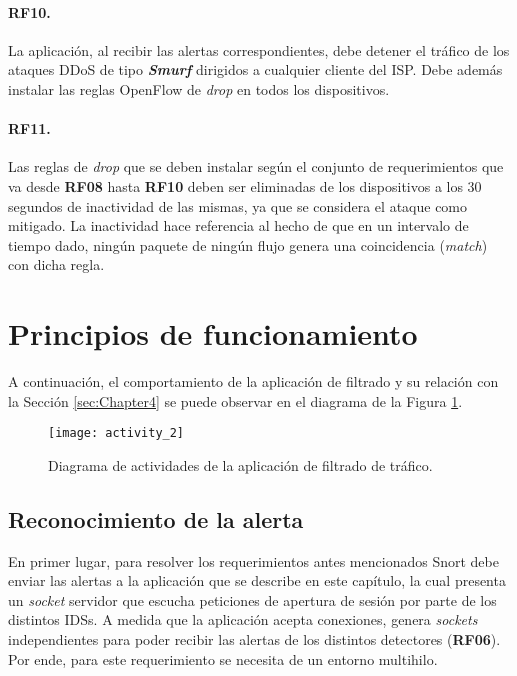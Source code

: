 \paragraph{RF10.} La aplicación, al recibir las alertas correspondientes, debe
detener el tráfico de los ataques DDoS de tipo \textbf{\textit{Smurf}} dirigidos
a cualquier cliente del ISP. Debe además instalar las reglas OpenFlow de
\textit{drop} en todos los dispositivos.

\paragraph{RF11.} Las reglas de \textit{drop} que se deben instalar según el
conjunto de requerimientos que va desde \textbf{RF08} hasta \textbf{RF10} deben
ser eliminadas de los dispositivos a los 30 segundos de inactividad de las
mismas, ya que se considera el ataque como mitigado. La inactividad hace
referencia al hecho de que en un intervalo de tiempo dado, ningún paquete de
ningún flujo genera una coincidencia (\textit{match}) con dicha regla.

\section{Principios de funcionamiento}

A continuación, el comportamiento de la aplicación de filtrado y su relación con
la Sección \ref{sec:Chapter4} se puede observar en el diagrama de la Figura
\ref{fig:diagram_flujo_filtrado}.

\begin{figure}[H]
	\centering 
	\texttt{[image: activity\_2]}
	\caption{Diagrama de actividades de la aplicación de filtrado de tráfico.}
	\label{fig:diagram_flujo_filtrado}
\end{figure}


\subsection {Reconocimiento de la alerta}

En primer lugar, para resolver los requerimientos antes mencionados Snort debe
enviar las alertas a la aplicación que se describe en este capítulo, la cual
presenta un \textit{socket} servidor que escucha peticiones de apertura de
sesión por parte de los distintos IDSs. A medida que la aplicación acepta
conexiones, genera \textit{sockets} independientes para poder recibir las
alertas de los distintos detectores (\textbf{RF06}). Por ende, para este
requerimiento se necesita de un entorno multihilo.

